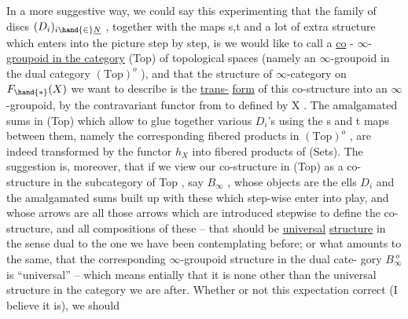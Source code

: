 
In a more suggestive way, we could say  this experimenting that
the family of discs $(D_i)_{i\hand{\in}\underline{N}}$ , together with the maps s,t and a lot of
extra structure which enters into the picture step by step, is  we
would like to call a \uline{co} - $\infty$-\uline{groupoid in the category} (Top) of topological
spaces (namely an $\infty$-groupoid in the dual category $(\mathrm{Top})^{o}$ ), and that
the structure of $\infty$-category on $F_{\hand{*}}(X)$ we want to describe is the \uline{trans-}%
\uline{form} of this co-structure into an $\infty$ -groupoid, by the contravariant
functor from  to  defined by X . The  amalgamated sums in (Top)
which allow to glue together  various $D_i$'s using the s and t maps
between them, namely the corresponding fibered products in $(\mathrm{Top})^{o}$ , are
indeed transformed by the functor $h_X$ into fibered products of (Sets).
The suggestion is, moreover, that if we view our co-structure in (Top)
as a co-structure in the subcategory of Top , say $B_\infty$ , whose objects
are the ells $D_i$ and the amalgamated sums built up with these which
step-wise enter into play, and whose arrows are all those arrows which
are introduced stepwise to define the co-structure, and all compositions
of these -- that  should be   \uline{universal} \uline{structure} in the sense
dual to the one we have been contemplating before; or what amounts to 
the same, that the corresponding $\infty$-groupoid structure in the dual cate-%
gory $B_\infty^{\ o}$ is ``universal'' -- which means entially that it is none
other than the universal structure in the category   we are after.
Whether or not this expectation   correct (I believe it is\hand{(!!!)}), we should
